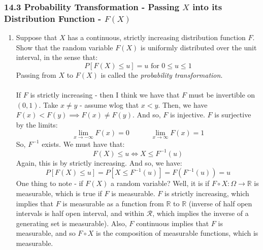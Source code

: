 \documentclass[12pt,a4paper]{article}
\newcommand{\1}[1]{\mathbbm{1}\left\{ #1 \right\}}
\newcommand{\R}{\mathbb{R}}
\newcommand{\rcal}{\mathcal{R}}
\begin{document}
\subsubsection{14.3 Probability Transformation - Passing $X$ into its Distribution Function - $F(X)$}
\begin{enumerate}
	\item Suppose that $X$ has a continuous, strictly increasing distribution function $F$. Show that the random variable $F(X)$ is uniformly distributed over the unit interval, in the sense that:
	$$
		P\left[F(X) \leq u\right] = u \text{ for $0 \leq u \leq 1$}
	$$
	Passing from $X$ to $F(X)$ is called the \textit{probability transformation}.
	\\\\
	If $F$ is strictly increasing - then I think we have that $F$ must be invertible on $(0,1)$. Take $x \neq y$ - assume wlog that $x < y$. Then, we have $F(x) < F(y) \implies F(x) \neq F(y)$. And so, $F$ is injective. $F$ is surjective by the limits:
	$$
		\lim_{x \to -\infty} F(x) = 0 \quad\quad\quad
		\lim_{x \to \infty} F(x) = 1
	$$
	So, $F^{-1}$ exists. We must have that:
	$$
		F(X) \leq u \Leftrightarrow X \leq F^{-1}(u)
	$$
	Again, this is by strictly increasing. And so, we have:
	$$
		P\left[F(X) \leq u\right] = P\left[X \leq F^{-1}(u)\right] = F(F^{-1}(u)) = u
	$$
	One thing to note - if $F(X)$ a random variable? Well, it is if $F \circ X : \Omega \to \R$ is measurable, which is true if $F$ is measurable. $F$ is strictly increasing, which implies that $F$ is measurable as a function from $\R$ to $\R$ (inverse of half open intervals is half open interval, and within $\rcal$, which implies the inverse of a generating set is measurable). Also, $F$ continuous implies that $F$ is measurable, and so $F \circ X$ is the composition of measurable functions, which is measurable.
	

\end{enumerate}
\end{document}
